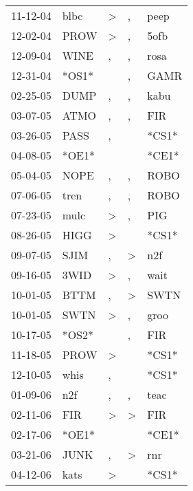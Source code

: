 \begin{supertabular}{lllll}
 11-12-04 &   blbc &     \textgreater &                , &   peep \\
 12-02-04 &   PROW &     \textgreater &                , &   5ofb \\
 12-09-04 &   WINE &                , &                , &   rosa \\
 12-31-04 &  *OS1* &                  &                , &   GAMR \\
 02-25-05 &   DUMP &                , &                , &   kabu \\
 03-07-05 &   ATMO &                , &                , &    FIR \\
 03-26-05 &   PASS &                , &                  &  *CS1* \\
 04-08-05 &  *OE1* &                  &                  &  *CE1* \\
 05-04-05 &   NOPE &                , &                , &   ROBO \\
 07-06-05 &   tren &                , &                , &   ROBO \\
 07-23-05 &   mulc &     \textgreater &                , &    PIG \\
 08-26-05 &   HIGG &     \textgreater &                  &  *CS1* \\
 09-07-05 &   SJIM &                , &     \textgreater &    n2f \\
 09-16-05 &   3WID &     \textgreater &                , &   wait \\
 10-01-05 &   BTTM &                , &     \textgreater &   SWTN \\
 10-01-05 &   SWTN &     \textgreater &                , &   groo \\
 10-17-05 &  *OS2* &                  &                , &    FIR \\
 11-18-05 &   PROW &     \textgreater &                  &  *CS1* \\
 12-10-05 &   whis &                , &                  &  *CS1* \\
 01-09-06 &    n2f &                , &                , &   teac \\
 02-11-06 &    FIR &     \textgreater &     \textgreater &    FIR \\
 02-17-06 &  *OE1* &                  &                  &  *CE1* \\
 03-21-06 &   JUNK &                , &     \textgreater &    rnr \\
 04-12-06 &   kats &     \textgreater &                  &  *CS1* \\

\end{supertabular}
